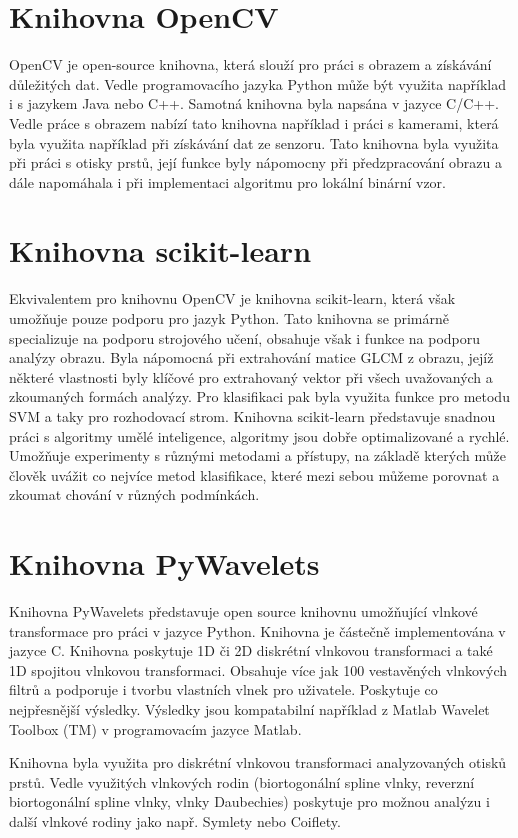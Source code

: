 \section{Knihovna OpenCV}
OpenCV je open-source knihovna, která slouží pro práci s obrazem a získávání důležitých dat. Vedle programovacího jazyka Python může být využita například i s jazykem Java nebo C++. Samotná knihovna byla napsána v jazyce C/C++.\cite{OpenCVLibrary} Vedle práce s obrazem nabízí tato knihovna například i práci s kamerami, která byla využita například při získávání dat ze senzoru. Tato knihovna byla využita při práci s otisky prstů, její funkce byly nápomocny při předzpracování obrazu a dále napomáhala i při implementaci algoritmu pro lokální binární vzor.

\section{Knihovna scikit-learn}
Ekvivalentem pro knihovnu OpenCV je knihovna scikit-learn, která však umožňuje pouze podporu pro jazyk Python. Tato knihovna se primárně specializuje na podporu strojového učení, obsahuje však i funkce na podporu analýzy obrazu. Byla nápomocná při extrahování matice GLCM z obrazu, jejíž některé vlastnosti byly klíčové pro extrahovaný vektor při všech uvažovaných a zkoumaných formách analýzy. Pro klasifikaci pak byla využita funkce pro metodu SVM a taky pro rozhodovací strom. Knihovna scikit-learn představuje snadnou práci s algoritmy umělé inteligence, algoritmy jsou dobře optimalizované a rychlé. Umožňuje experimenty s různými metodami a přístupy, na základě kterých může člověk uvážit co nejvíce metod klasifikace, které mezi sebou můžeme porovnat a zkoumat chování v různých podmínkách.

\section{Knihovna PyWavelets}
Knihovna PyWavelets představuje open source knihovnu umožňující vlnkové transformace pro práci v jazyce Python. Knihovna je částečně implementována v jazyce C. Knihovna poskytuje 1D či 2D diskrétní vlnkovou transformaci a také 1D spojitou vlnkovou transformaci. Obsahuje více jak 100 vestavěných vlnkových filtrů a podporuje i tvorbu vlastních vlnek pro uživatele. Poskytuje co nejpřesnější výsledky. Výsledky jsou kompatabilní například z Matlab Wavelet Toolbox (TM) v programovacím jazyce Matlab.

Knihovna byla využita pro diskrétní vlnkovou transformaci analyzovaných otisků prstů. Vedle využitých vlnkových rodin (biortogonální spline vlnky, reverzní biortogonální spline vlnky, vlnky Daubechies) poskytuje pro možnou analýzu i další vlnkové rodiny jako např. Symlety nebo Coiflety.\cite{PywtAbout}

